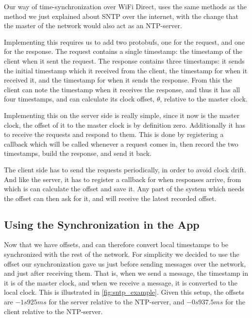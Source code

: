Our way of time-synchronization over WiFi Direct, uses the same methods as the method we just explained about \ac{SNTP} over the internet, with the change that the master of the network would also act as an \ac{NTP}-server.

Implementing this requires us to add two protobufs, one for the request, and one for the response.
The request contains a single timestamp: the timestamp of the client when it sent the request.
The response contains three timestamps: it sends the initial timestamp which it received from the client, the timestamp for when it received it, and the timestamp for when it sends the response.
From this the client can note the timestamp when it receives the response, and thus it has all four timestamps, and can calculate its clock offset, $\theta$, relative to the master clock.

Implementing this on the server side is really simple, since it now is the master clock, the offset of it to the master clock is by definition zero.
Additionally it has to receive the requests and respond to them.
This is done by registering a callback which will be called whenever a request comes in, then record the two timestamps, build the response, and send it back.

The client side has to send the requests periodically, in order to avoid clock drift.
And like the server, it has to register a callback for when responses arrive, from which is can calculate the offset and save it.
Any part of the system which needs the offset can then ask for it, and will receive the latest recorded offset.

\subsection{Using the Synchronization in the App}
Now that we have offsets, and can therefore convert local timestamps to be synchronized with the rest of the network.
For simplicity we decided to use the offset our synchronization gave us just before sending messages over the network, and just after receiving them.
That is, when we send a message, the timestamp in it is of the master clock, and when we receive a message, it is converted to the local clock.
This is illustrated in \ref{fig:sntp_example}.
Given this setup, the offsets are $-1s925ms$ for the server relative to the \ac{NTP}-server, and $-0s937.5ms$ for the client relative to the \ac{NTP}-server.


